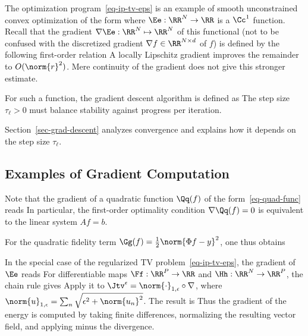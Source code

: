 The optimization program~\eqref{eq-ip-tv-eps} is an example of smooth unconstrained convex optimization of the form
where $\Ee : \RR^N \rightarrow \RR$ is a $\Cc^1$ function. Recall that the gradient $\nabla \Ee : \RR^N \mapsto \RR^N$ of this functional (not to be confused with the discretized gradient $\nabla f \in \RR^{N\times d}$ of $f$) is defined by the following first-order relation
A locally Lipschitz gradient improves the remainder to $O(\norm{r}^2)$. Mere continuity of the gradient does not give this stronger estimate.

For such a function, the gradient descent algorithm is defined as
The step size $\tau_\ell>0$ must balance stability against progress per iteration.

Section~\ref{sec-grad-descent} analyzes convergence and explains how it depends on the step size $\tau_\ell$.



\subsection{Examples of Gradient Computation}
\label{eq-example-grad}

Note that the gradient of a quadratic function $\Qq(f)$ of the form~\eqref{eq-quad-func} reads
In particular, the first-order optimality condition $\nabla \Qq(f)=0$ is equivalent to the linear system $Af=b$.

For the quadratic fidelity term $\Gg(f)=\frac{1}{2}\norm{\Phi f-y}^2$, one thus obtains

In the special case of the regularized TV problem~\eqref{eq-ip-tv-eps}, the gradient of $\Ee$ reads
For differentiable maps $\Ff:\RR^P\to\RR$ and $\Hh:\RR^N\to\RR^P$, the chain rule gives
Apply it to $\Jtv^\epsilon=\norm{\cdot}_{1,\epsilon}\circ\nabla$, where $\norm{u}_{1,\epsilon}=\sum_n\sqrt{\epsilon^2+\norm{u_n}^2}$. The result is
Thus the gradient of the energy is computed by taking finite differences, normalizing the resulting vector field, and applying minus the divergence.

